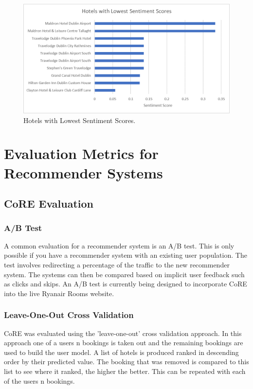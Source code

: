 \begin{figure}[h!]
\centering
\includegraphics[width=1\textwidth]{evaluation/lowest.png}
\caption{\label{fig:lowest} Hotels with Lowest Sentiment Scores.}
\end{figure}

\section{Evaluation Metrics for Recommender Systems}

\subsection{CoRE Evaluation}

\subsubsection*{A/B Test}

A common evaluation for a recommender system is an A/B test. This is only possible if you have a recommender system with an existing user population. The test involves redirecting a percentage of the traffic to the new recommender system. The systems can then be compared based on implicit user feedback such as clicks and skips. An A/B test is currently being designed to incorporate CoRE into the live Ryanair Rooms website.

\subsubsection*{Leave-One-Out Cross Validation}

CoRE was evaluated using the 'leave-one-out' cross validation approach. In this approach one of a users n bookings is taken out and the remaining bookings are used to build the user model. A list of hotels is produced ranked in descending order by their predicted value. The booking that was removed is compared to this list to see where it ranked, the higher the better. This can be repeated with each of the users n bookings.

